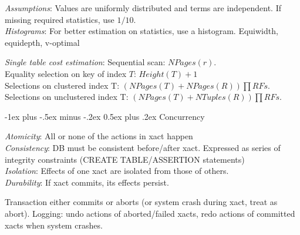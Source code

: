 \documentclass[10pt,landscape]{article}
\makeatletter
\renewcommand{\section}{\@startsection{section}{1}{0mm}%
                                {-1ex plus -.5ex minus -.2ex}%
                                {0.5ex plus .2ex}%
                                {\normalfont\large\bfseries}}
\makeatother
\begin{document}
\begin{multicols}{3}
\textit{Assumptions}: Values are uniformly distributed and terms are independent. If missing required statistics, use $1/10$. \\
\textit{Histograms}: For better estimation on statistics, use a histogram. Equiwidth, equidepth, v-optimal


\textit{Single table cost estimation}: Sequential scan: $NPages(r)$. \\
Equality selection on key of index $T$: $Height(T) + 1$ \\
Selections on clustered index T: $(NPages(T) + NPages(R)) \prod RFs$. \\
Selections on unclustered index T: $(NPages(T) + NTuples(R)) \prod RFs$.


\section{Concurrency}

\textit{Atomicity}: All or none of the actions in xact happen \\
\textit{Consistency}: DB must be consistent before/after xact. Expressed as series of integrity constraints (CREATE TABLE/ASSERTION statements) \\
\textit{Isolation}: Effects of one xact are isolated from those of others. \\
\textit{Durability}: If xact commits, its effects persist.

Transaction either commits or aborts (or system crash during xact, treat as abort). Logging: undo actions of aborted/failed xacts, redo actions of committed xacts when system crashes.


\end{multicols}
\end{document}
